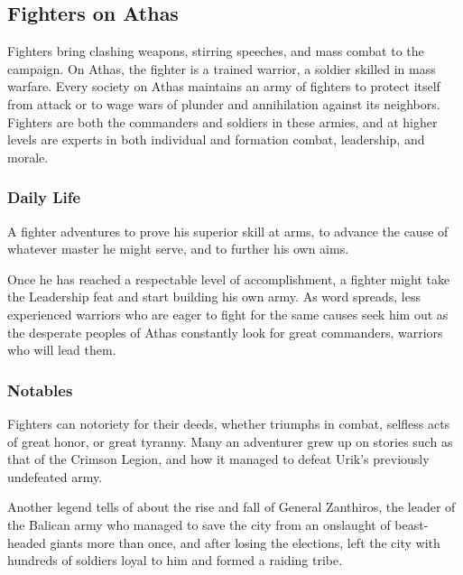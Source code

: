 \subsection{Fighters on Athas}

Fighters bring clashing weapons, stirring speeches, and mass combat to the campaign. On Athas, the fighter is a trained warrior, a soldier skilled in mass warfare. Every society on Athas maintains an army of fighters to protect itself from attack or to wage wars of plunder and annihilation against its neighbors. Fighters are both the commanders and soldiers in these armies, and at higher levels are experts in both individual and formation combat, leadership, and morale.

\subsubsection{Daily Life}

A fighter adventures to prove his superior skill at arms, to advance the cause of whatever master he might serve, and to further his own aims.

Once he has reached a respectable level of accomplishment, a fighter might take the Leadership feat and start building his own army. As word spreads, less experienced warriors who are eager to fight for the same causes seek him out as the desperate peoples of Athas constantly look for great commanders, warriors who will lead them.

\subsubsection{Notables}

Fighters can notoriety for their deeds, whether triumphs in combat, selfless acts of great honor, or great tyranny. Many an adventurer grew up on stories such as that of the Crimson Legion, and how it managed to defeat Urik's previously undefeated army.

Another legend tells of about the rise and fall of General Zanthiros, the leader of the Balican army who managed to save the city from an onslaught of beast-headed giants more than once, and after losing the elections, left the city with hundreds of soldiers loyal to him and formed a raiding tribe.


